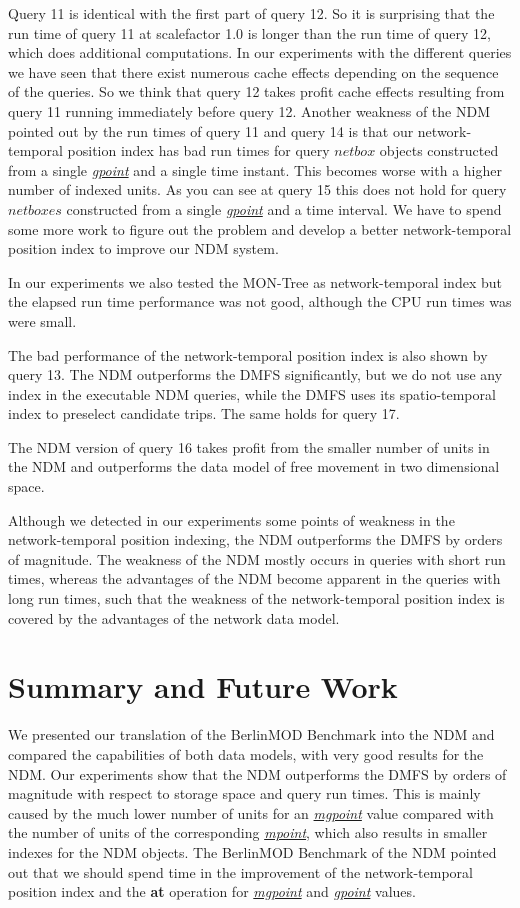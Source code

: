 \documentclass[a4paper]{article}
\newcommand{\bmodb} {BerlinMOD Benchmark}
\newcommand{\op}[1]{\textbf{#1}}
\newcommand{\dt}[1]{\textsl{\underline{#1}}}
\begin{document}
Query 11 is identical with the first part of query 12. So it is surprising that
the run time of query 11 at scalefactor 1.0 is longer than the run time of query 12,
which does additional computations. In our experiments with the different queries
we have seen that there exist numerous cache effects depending on the sequence of
the queries. So we think that query 12 takes profit cache effects resulting from
query 11 running immediately before query 12. Another weakness of the NDM pointed
out by the run times of query 11 and query 14 is that our
network-temporal position index has bad run times for query $netbox$ objects
constructed from a single \dt{gpoint} and a single time instant. This becomes worse
with a higher number of indexed units. As you can see at query 15 this does not
hold for query $netboxes$ constructed from a single \dt{gpoint} and a time interval.
We have to spend some more work to figure out the problem and develop a better
network-temporal position index to improve our NDM system.

In our experiments we also tested the MON-Tree \cite{MONTreeAlmeidaGeoinformatica} as network-temporal
index but the elapsed run time performance was not good, although the CPU run times
was were small.

The bad performance of the network-temporal position index is also shown by query 13.
The NDM outperforms the DMFS significantly, but we do not use any index in the
executable NDM queries, while the DMFS uses its spatio-temporal index to preselect
candidate trips. The same holds for query 17.

The NDM version of query 16 takes profit from the smaller number
of units in the NDM and outperforms the data model of free movement
in two dimensional space.

Although we detected in our experiments some points of weakness in the network-temporal
position indexing, the NDM outperforms the DMFS by orders of magnitude. The weakness
of the NDM mostly occurs in queries with short run times, whereas the advantages
of the NDM become apparent in the queries with long run times, such that the weakness
of the network-temporal position index is covered by the advantages of the network
data model.
\section{Summary and Future Work}
\label{sec:summary}
We presented our translation of the \bmodb{} into the NDM and
compared the capabilities of both data models, with very good results for the
NDM. Our experiments show that the NDM outperforms
the DMFS by orders of magnitude with respect to storage space and query run times.
This is mainly caused by the much lower number of units for an \dt{mgpoint} value
compared with the number of units of the corresponding \dt{mpoint}, which also
results in smaller indexes for the NDM objects. The \bmodb{} of the NDM pointed out
that we should spend time in the improvement of the network-temporal position index
and the \op{at} operation for \dt{mgpoint} and \dt{gpoint} values.
\end{document}
